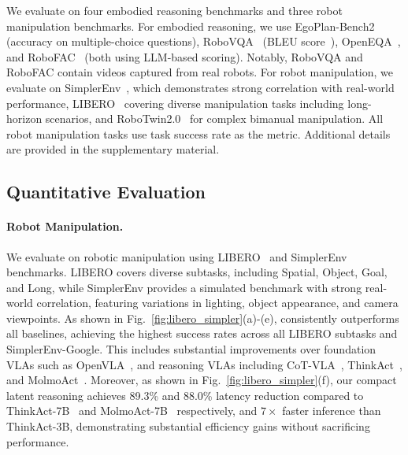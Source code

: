 We evaluate \ours{} on four embodied reasoning benchmarks and three robot manipulation benchmarks. For embodied reasoning, we use EgoPlan-Bench2~\cite{qiu2024egoplan2} (accuracy on multiple-choice questions), RoboVQA~\cite{sermanet2024robovqa} (BLEU score~\cite{papineni2002bleu}), OpenEQA~\cite{majumdar2024openeqa}, and RoboFAC~\cite{lu2025robofac} (both using LLM-based scoring). Notably, RoboVQA and RoboFAC contain videos captured from real robots. For robot manipulation, we evaluate on SimplerEnv~\cite{li24simpler}, which demonstrates strong correlation with real-world performance, LIBERO~\cite{liu2023libero} covering diverse manipulation tasks including long-horizon scenarios, and RoboTwin2.0~\cite{chen2025robotwin2} for complex bimanual manipulation. All robot manipulation tasks use task success rate as the metric. Additional details are provided in the supplementary material.

\subsection{Quantitative Evaluation}


\paragraph{Robot Manipulation.}




We evaluate \ours{} on robotic manipulation using LIBERO~\cite{liu2023libero} and SimplerEnv~\cite{li24simpler} benchmarks. LIBERO covers diverse subtasks, including Spatial, Object, Goal, and Long, while SimplerEnv provides a simulated benchmark with strong real-world correlation, featuring variations in lighting, object appearance, and camera viewpoints. As shown in Fig.~\ref{fig:libero_simpler}(a)-(e), \ours{} consistently outperforms all baselines, achieving the highest success rates across all LIBERO subtasks and SimplerEnv-Google. This includes substantial improvements over foundation VLAs such as OpenVLA~\cite{kim24openvla}, and reasoning VLAs including CoT-VLA~\cite{zhao2025cot}, ThinkAct~\cite{huang2025thinkact}, and MolmoAct~\cite{lee2025molmoact}. Moreover, as shown in Fig.~\ref{fig:libero_simpler}(f), our compact latent reasoning achieves 89.3\% and 88.0\% latency reduction compared to ThinkAct-7B~\cite{huang2025thinkact} and MolmoAct-7B~\cite{lee2025molmoact} respectively, and $7\times$ faster inference than ThinkAct-3B, demonstrating substantial efficiency gains without sacrificing performance.

